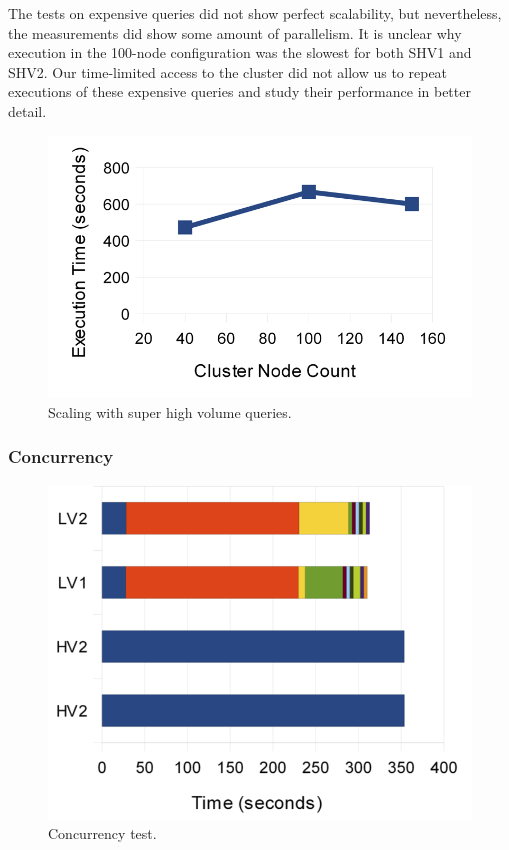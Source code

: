 \documentclass[DM,lsstdraft,toc]{lsstdoc}
\begin{document}
The tests on expensive queries did not show perfect scalability, but
nevertheless, the measurements did show some amount of parallelism. It
is unclear why execution in the 100-node configuration was the slowest
for both SHV1 and SHV2. Our time-limited access to the cluster did not
allow us to repeat executions of these expensive queries and study their
performance in better detail.

\begin{figure}[H]
\centering
\includegraphics{_static/150_node_super_high_volume.png}
\caption{Scaling with super high volume queries.}
\end{figure}

\subsubsection{Concurrency}\label{concurrency}

\begin{figure}[H]
\centering
\includegraphics{_static/150_node_concurrency.png}
\caption{Concurrency test.}
\end{figure}
\end{document}
